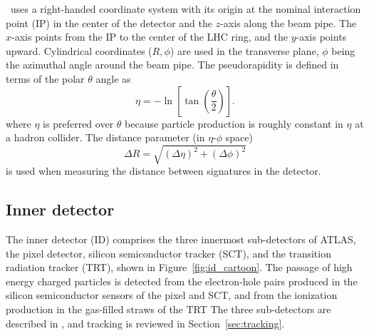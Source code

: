 \atlas\ uses a right-handed coordinate system with its origin at the nominal
interaction point (IP) in the center of the detector and the $z$-axis
along the beam pipe. The $x$-axis points from the IP to the center of the
LHC ring, and the $y$-axis points upward. Cylindrical coordinates
($R,\phi$) are used in the transverse plane, $\phi$ being the azimuthal
angle around the beam pipe. The pseudorapidity is defined in terms of the
polar $\theta$ angle as
\begin{equation}
  \eta = -\ln\left[\tan(\frac{\theta}{2})\right].
\end{equation}
where $\eta$ is preferred over $\theta$ because particle production is roughly
constant in $\eta$ at a hadron collider.
The distance parameter (in $\eta$-$\phi$ space)
\begin{equation}
  \Delta R = \sqrt{(\Delta \eta)^2 + (\Delta \phi)^2}
\end{equation}
is used when measuring the distance between signatures in the detector.

\subsection{Inner detector} 
\label{sec:id}

The inner detector (ID) comprises the three innermost sub-detectors of ATLAS,
the pixel detector, silicon semiconductor tracker (SCT), and the transition
radiation tracker (TRT), shown in Figure~\ref{fig:id_cartoon}.
The passage of high energy charged particles is detected from the electron-hole
pairs produced in the silicon semiconductor sensors of the pixel and SCT, and
from the ionization production in the gas-filled straws of the TRT
The three sub-detectors are described in ,
and tracking is reviewed in Section~\ref{sec:tracking}.

